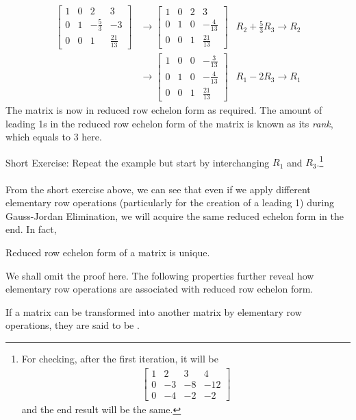 \begin{solution}
\begin{align*}
\begin{bmatrix}
1 & 0 & 2 & 3 \\
0 & 1 & -\frac{5}{3} & -3 \\
0 & 0 & 1 & \frac{21}{13}
\end{bmatrix} 
&\to
\begin{bmatrix}
1 & 0 & 2 & 3 \\
0 & 1 & 0 & -\frac{4}{13} \\
0 & 0 & 1 & \frac{21}{13}
\end{bmatrix} 
& R_2 + \frac{5}{3}R_3 \to R_2 \\
&\to
\begin{bmatrix}
1 & 0 & 0 & -\frac{3}{13} \\
0 & 1 & 0 & -\frac{4}{13} \\
0 & 0 & 1 & \frac{21}{13}
\end{bmatrix} 
& R_1 - 2R_3 \to R_1
\end{align*}
The matrix is now in reduced row echelon form as required. The amount of leading 1s in the reduced row echelon form of the matrix is known as its \textit{rank}, which equals to $3$ here.
\end{solution}
Short Exercise: Repeat the example but start by interchanging $R_1$ and $R_3$.\footnote{For checking, after the first iteration, it will be
\begin{align*}
\begin{bmatrix}
1 & 2 & 3 & 4 \\
0 & -3 & -8 & -12 \\
0 & -4 & -2 & -2
\end{bmatrix}    
\end{align*}
and the end result will be the same.}\\
\\
From the short exercise above, we can see that even if we apply different elementary row operations (particularly for the creation of a leading 1) during Gauss-Jordan Elimination, we will acquire the same reduced echelon form in the end. In fact,
\begin{thm}
\label{thm:uniquerref}
Reduced row echelon form of a matrix is unique.
\end{thm}
We shall omit the proof here. The following properties further reveal how elementary row operations are associated with reduced row echelon form.
\begin{proper}
\label{proper:rowequiv}
If a matrix can be transformed into another matrix by elementary row operations, they are said to be .
\end{proper}

